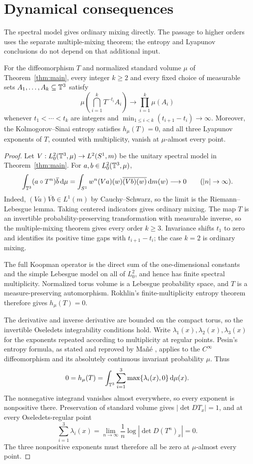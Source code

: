 \section{Dynamical consequences}
\label{sec:consequences}

The spectral model gives ordinary mixing directly. The passage to higher
orders uses the separate multiple-mixing theorem; the entropy and Lyapunov
conclusions do not depend on that additional input.

\begin{corollary}\label{cor:dynamical-profile}
For the diffeomorphism $T$ and normalized standard volume $\mu$ of
Theorem~\ref{thm:main}, every integer $k\ge2$ and every fixed choice of
measurable sets $A_1,\ldots,A_k\subseteq\mathbb T^3$ satisfy
\[
 \mu\left(\bigcap_{i=1}^k T^{-t_i}A_i\right)
 \longrightarrow\prod_{i=1}^k\mu(A_i)
\]
whenever $t_1<\cdots<t_k$ are integers and
$\min_{1\le i<k}(t_{i+1}-t_i)\to\infty$. Moreover, the
Kolmogorov--Sinai entropy satisfies $h_\mu(T)=0$, and all three Lyapunov
exponents of $T$, counted with multiplicity, vanish at $\mu$-almost every
point.
\end{corollary}

\begin{proof}
Let $V:L^2_0(\mathbb T^3,\mu)\to L^2(S^1,m)$ be the unitary spectral model in
Theorem~\ref{thm:main}. For $a,b\in L^2_0(\mathbb T^3,\mu)$,
\[
 \int_{\mathbb T^3}(a\circ T^n)\overline b\,\mathrm d\mu
 =\int_{S^1}w^n(Va)(w)\overline{(Vb)(w)}\,\mathrm d m(w)
 \longrightarrow0\qquad(|n|\to\infty).
\]
Indeed, $(Va)\overline{Vb}\in L^1(m)$ by Cauchy--Schwarz, so the limit is
the Riemann--Lebesgue lemma. Taking centered indicators gives ordinary
mixing. The map $T$ is an invertible probability-preserving transformation
with measurable inverse, so the multiple-mixing theorem
\cite[Theorem~1.1]{MultipleMixing2026} gives every order $k\ge3$.
Invariance shifts $t_1$ to zero and identifies its positive time gaps with
$t_{i+1}-t_i$; the case $k=2$ is ordinary mixing.

The full Koopman operator is the direct sum of the one-dimensional
constants and the simple Lebesgue model on all of $L^2_0$, and hence has
finite spectral multiplicity. Normalized torus volume is a Lebesgue
probability space, and $T$ is a measure-preserving automorphism.
Rokhlin's finite-multiplicity entropy theorem
\cite[\S 7, p.~13]{Rokhlin1960} therefore gives $h_\mu(T)=0$.

The derivative and inverse derivative are bounded on the compact torus,
so the invertible Oseledets integrability conditions hold. Write
$\lambda_1(x),\lambda_2(x),\lambda_3(x)$ for the exponents repeated
according to multiplicity at regular points. Pesin's entropy formula,
as stated and reproved by Ma\~n\'e \cite[p.~95, equation~(2)]{Mane1981},
applies to the $C^\infty$ diffeomorphism and its absolutely continuous
invariant probability $\mu$. Thus
\[
 0=h_\mu(T)=\int_{\mathbb T^3}\sum_{i=1}^3\max\{\lambda_i(x),0\}\,\mathrm d\mu(x).
\]
The nonnegative integrand vanishes almost everywhere, so every exponent
is nonpositive there. Preservation of standard volume gives
$|\det DT_x|=1$, and at every Oseledets-regular point
\[
 \sum_{i=1}^3\lambda_i(x)
 =\lim_{n\to\infty}\frac1n\log|\det D(T^n)_x|=0.
\]
The three nonpositive exponents must therefore all be zero at
$\mu$-almost every point.
\end{proof}
